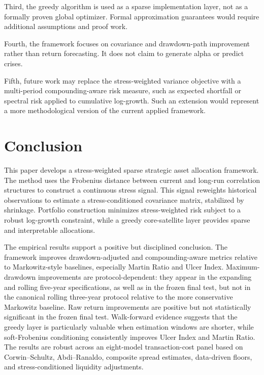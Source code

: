 \documentclass[11pt]{article}
\begin{document}
Third, the greedy algorithm is used as a sparse implementation layer, not as a formally proven global optimizer. Formal approximation guarantees would require additional assumptions and proof work.

Fourth, the framework focuses on covariance and drawdown-path improvement rather than return forecasting. It does not claim to generate alpha or predict crises.

Fifth, future work may replace the stress-weighted variance objective with a multi-period compounding-aware risk measure, such as expected shortfall or spectral risk applied to cumulative log-growth. Such an extension would represent a more methodological version of the current applied framework.

\section{Conclusion}
\label{sec:conclusion}

This paper develops a stress-weighted sparse strategic asset allocation framework. The method uses the Frobenius distance between current and long-run correlation structures to construct a continuous stress signal. This signal reweights historical observations to estimate a stress-conditioned covariance matrix, stabilized by shrinkage. Portfolio construction minimizes stress-weighted risk subject to a robust log-growth constraint, while a greedy core-satellite layer provides sparse and interpretable allocations.

The empirical results support a positive but disciplined conclusion. The framework improves drawdown-adjusted and compounding-aware metrics relative to Markowitz-style baselines, especially Martin Ratio and Ulcer Index. Maximum-drawdown improvements are protocol-dependent: they appear in the expanding and rolling five-year specifications, as well as in the frozen final test, but not in the canonical rolling three-year protocol relative to the more conservative Markowitz baseline. Raw return improvements are positive but not statistically significant in the frozen final test. Walk-forward evidence suggests that the greedy layer is particularly valuable when estimation windows are shorter, while soft-Frobenius conditioning consistently improves Ulcer Index and Martin Ratio. The results are robust across an eight-model transaction-cost panel based on Corwin--Schultz, Abdi--Ranaldo, composite spread estimates, data-driven floors, and stress-conditioned liquidity adjustments.
\end{document}
